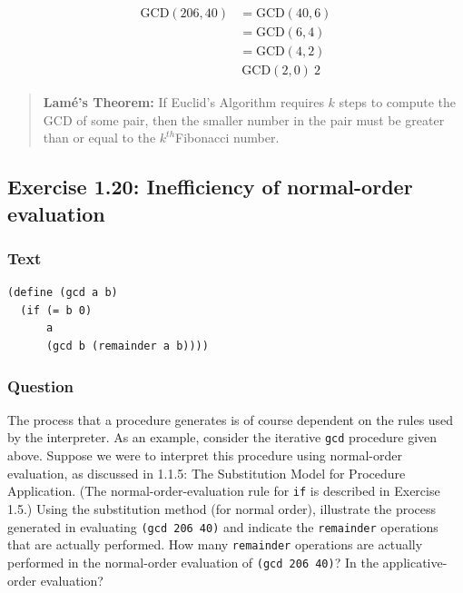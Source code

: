 \documentclass[final,fleqn,titlepage,twoside]{article}
\begin{document}
\[\begin{aligned}\text{GCD}(206,40) &= \text{GCD}(40,6)\\ &=
            \text{GCD}(6,4)\\ &= \text{GCD}(4,2)\\ &~ \text{GCD}(2,0) ~
            2\end{aligned}\]

\begin{quote}
\textbf{Lamé's Theorem:} If Euclid's Algorithm requires \(k\) steps to compute the
 GCD of some pair, then the smaller number in the pair must be greater than or
 equal to the \(k^{th}\)Fibonacci number.
\end{quote}

\subsection{Exercise 1.20: Inefficiency of normal-order evaluation}
\label{sec:org238b70e}
\subsubsection{Text}
\label{sec:org8f2c2b3}
\begin{verbatim}
(define (gcd a b)
  (if (= b 0)
      a
      (gcd b (remainder a b))))
\end{verbatim}

\subsubsection{Question}
\label{sec:org662adba}
The process that a procedure generates is of course dependent on the rules used
by the interpreter. As an example, consider the iterative \texttt{gcd}
procedure given above. Suppose we were to interpret this procedure using
normal-order evaluation, as discussed in 1.1.5: The Substitution Model for Procedure Application. (The normal-order-evaluation
rule for \texttt{if} is described in Exercise 1.5.) Using the substitution
method (for normal order), illustrate the process generated in evaluating
\texttt{(gcd 206 40)} and indicate the \texttt{remainder} operations that
are actually performed. How many \texttt{remainder} operations are actually
performed in the normal-order evaluation of \texttt{(gcd 206 40)}? In the
applicative-order evaluation?
\end{document}
